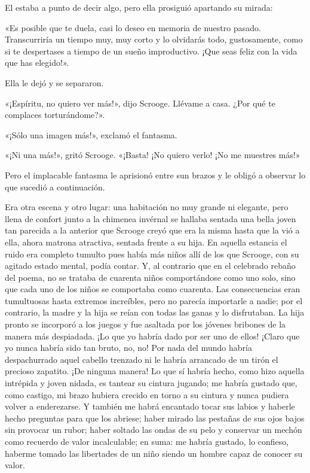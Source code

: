\documentclass{novela}
\begin{document}
 El estaba a punto de decir algo, pero ella prosiguió apartando su mirada:

 «Es posible que te duela, casi lo deseo en memoria de nuestro pasado. Transcurriría un tiempo muy, muy corto y lo olvidarás todo, gustosamente, como si te despertases a tiempo de un sueño improductivo. ¡Que seas feliz con la vida que has elegido!».

 Ella le dejó y se separaron.

 «¡Espíritu, no quiero ver más!», dijo Scrooge. Llévame a casa. ¿Por qué te complaces torturándome?».

 «¡Sólo una imagen más!», exclamó el fantasma.

 «¡Ni una más!», gritó Scrooge. «¡Basta! ¡No quiero verlo! ¡No me muestres más!»

 Pero el implacable fantasma le aprisionó entre sun brazos y le obligó a observar lo que sucedió a continuación.

 Era otra escena y otro lugar: una habitación no muy grande ni elegante, pero llena de confort junto a la chimenea invérnal se hallaba sentada una bella joven tan parecida a la anterior que Scrooge creyó que era la misma hasta que la vió a ella, ahora matrona atractiva, sentada frente a su hija. En aquella estancia el ruido era completo tumulto pues había más niños allí de los que Scrooge, con su agitado estado mental, podía contar. Y, al contrario que en el celebrado rebaño del poema, no se trataba de cuarenta niños comportándose como uno solo, sino que cada uno de los niños se comportaba como cuarenta. Las consecuencias eran tumultuosas hasta extremos increíbles, pero no parecía importarle a nadie; por el contrario, la madre y la hija se reían con todas las ganas y lo disfrutaban. La hija pronto se incorporó a los juegos y fue asaltada por los jóvenes bribones de la manera más despiadada. ¡Lo que yo habría dado por ser uno de ellos! ¡Claro que yo nunca habría sido tan bruto, no, no! Por nada del mundo habría despachurrado aquel cabello trenzado ni le habría arrancado de un tirón el precioso zapatito. ¡De ninguna manera! Lo que sí habría hecho, como hizo aquella intrépida y joven nidada, es tantear su cintura jugando; me habría gustado que, como castigo, mi brazo hubiera crecido en torno a su cintura y nunca pudiera volver a enderezarse. Y también me habrá encantado tocar sus labios y haberle hecho preguntas para que los abriese; haber mirado las pestañas de sus ojos bajos sin provocar un rubor; haber soltado las ondas de su pelo y conservar un mechón como recuerdo de valor incalculable; en suma: me habría gustado, lo confieso, haberme tomado las libertades de un niño siendo un hombre capaz de conocer su valor.
\end{document}
